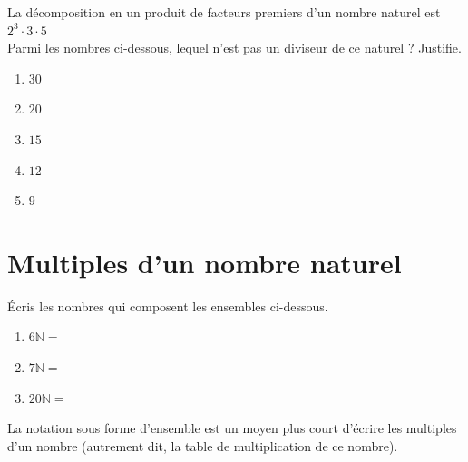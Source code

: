 \documentclass[../../syllabus_1.tex]{subfiles}
\begin{document}
\vspace{6em}

\begin{exercise}
      La décomposition en un produit de facteurs premiers d'un nombre naturel est $2^3\cdot 3 \cdot 5$ \\
      Parmi les nombres ci-dessous, lequel n'est pas un diviseur de ce naturel ? Justifie.
      \begin{enumerate}[cols=5, label=\ ]
            \item $30$
            \item $20$
            \item $15$
            \item $12$
            \item $9$
      \end{enumerate}
      \vspace{7em}
\end{exercise}

\newpage
\section{Multiples d'un nombre naturel}

Écris les nombres qui composent les ensembles ci-dessous.
\begin{enumerate}[itemsep=2em]
      \item \(6\mathbb{N} =\)
      \item \(7\mathbb{N} =\)
      \item \(20\mathbb{N}=\)
\end{enumerate}

La notation sous forme d'ensemble est un moyen plus court d'écrire les multiples d'un nombre (autrement dit, la table de multiplication de ce nombre).
\begin{center}
\end{center}
\end{document}
